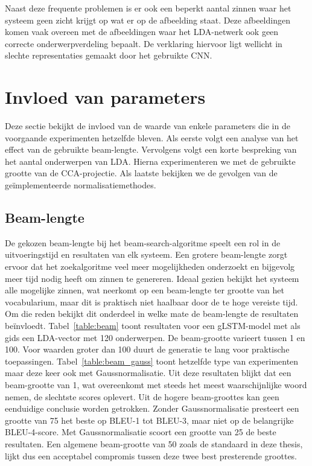 Naast deze frequente problemen is er ook een beperkt aantal zinnen waar het systeem geen zicht krijgt op wat er op de afbeelding staat.
Deze afbeeldingen komen vaak overeen met de afbeeldingen waar het LDA-netwerk ook geen correcte onderwerpverdeling bepaalt.
De verklaring hiervoor ligt wellicht in slechte representaties gemaakt door het gebruikte CNN.
    
\section{Invloed van parameters}
\label{sec:invloed-parameters}
Deze sectie bekijkt de invloed van de waarde van enkele parameters die in de voorgaande experimenten hetzelfde bleven. Als eerste volgt een analyse van het effect van de gebruikte beam-lengte. Vervolgens volgt een korte bespreking van het aantal onderwerpen van LDA. Hierna experimenteren we met de gebruikte grootte van de CCA-projectie. Als laatste bekijken we de gevolgen van de ge\"implementeerde normalisatiemethodes.

\subsection{Beam-lengte}
De gekozen beam-lengte bij het beam-search-algoritme speelt een rol in de uitvoeringstijd en resultaten van elk systeem. 
Een grotere beam-lengte zorgt ervoor dat het zoekalgoritme veel meer mogelijkheden onderzoekt en bijgevolg meer tijd nodig heeft om zinnen te genereren.
Ideaal gezien bekijkt het systeem alle mogelijke zinnen, wat neerkomt op een beam-lengte ter grootte van het vocabularium, maar dit is praktisch niet haalbaar door de te hoge vereiste tijd.
Om die reden bekijkt dit onderdeel in welke mate de beam-lengte de resultaten be\"invloedt.
Tabel~\ref{table:beam} toont resultaten voor een gLSTM-model met als gids een LDA-vector met 120 onderwerpen. De beam-grootte varieert tussen 1 en 100. Voor waarden groter dan 100 duurt de generatie te lang voor praktische toepassingen. Tabel~\ref{table:beam_gauss} toont hetzelfde type van experimenten maar deze keer ook met Gaussnormalisatie. Uit deze resultaten blijkt dat een beam-grootte van 1, wat overeenkomt met steeds het meest waarschijnlijke woord nemen, de slechtste scores oplevert. Uit de hogere beam-groottes kan geen eenduidige conclusie worden getrokken. Zonder Gaussnormalisatie presteert een grootte van 75 het beste op BLEU-1 tot BLEU-3, maar niet op de belangrijke BLEU-4-score. Met Gaussnormalisatie scoort een grootte van 25 de beste resultaten. Een algemene beam-grootte van 50 zoals de standaard in deze thesis, lijkt dus een acceptabel compromis tussen deze twee best presterende groottes.

